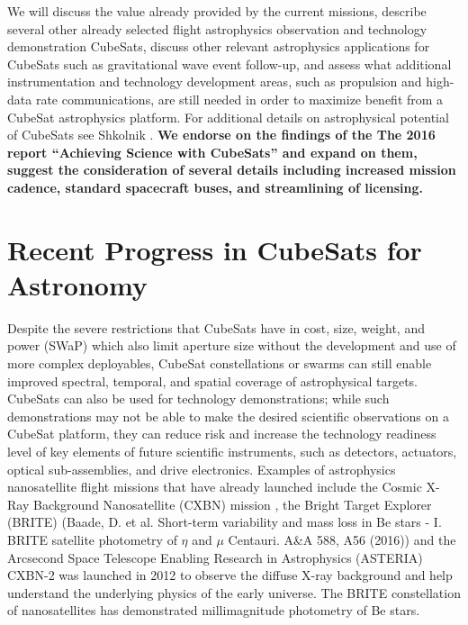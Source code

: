 \documentclass[12pt]{article}
\begin{document}
We will discuss the value already provided by the current missions, describe several other already selected flight astrophysics observation and technology demonstration CubeSats, discuss other relevant astrophysics applications for CubeSats such as gravitational wave event follow-up, and assess what additional instrumentation and technology development areas, such as propulsion and high-data rate communications, are still needed in order to maximize benefit from a CubeSat astrophysics platform.
For additional details on astrophysical potential of CubeSats see Shkolnik \cite{2018NatAs...2..374S}.
\textbf{We endorse on the findings of the The 2016 report ``Achieving Science with CubeSats'' \cite{national_academies_of_sciences_achieving_2016} and expand on them, suggest the consideration of several details including increased mission cadence, standard spacecraft buses, and streamlining of licensing.}

\section{Recent Progress in CubeSats for Astronomy}

Despite the severe restrictions that CubeSats have in cost, size, weight, and power (SWaP) which also limit aperture size without the development and use of more complex deployables, CubeSat constellations or swarms can still enable improved spectral, temporal, and spatial coverage of astrophysical targets. CubeSats can also be used for technology demonstrations; while such demonstrations may not be able to make the desired scientific observations on a CubeSat platform, they can reduce risk and increase the technology readiness level of key elements of future scientific instruments, such as detectors, actuators, optical sub-assemblies, and drive electronics.
Examples of astrophysics nanosatellite flight missions that have already launched include the Cosmic X-Ray Background Nanosatellite (CXBN) mission \cite{2012SPIE.8507E..19S}, the Bright Target Explorer (BRITE) (Baade, D. et al. Short-term variability and mass loss in Be stars - I. BRITE satellite photometry of $\eta$ and $\mu$ Centauri. A\&A 588, A56 (2016)) and the Arcsecond Space Telescope Enabling Research in Astrophysics (ASTERIA) \cite{smith_-orbit_2018}  CXBN-2 was launched in 2012 to observe the diffuse X-ray background and help understand the underlying physics of the early universe. The BRITE constellation of nanosatellites has demonstrated millimagnitude photometry of Be stars.
\end{document}
